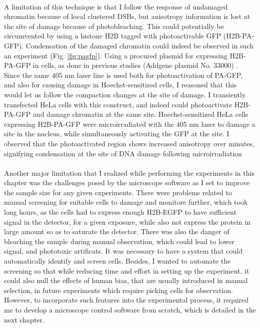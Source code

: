 \paragraph*{} A limitation of this technique is that I follow the response of undamaged chromatin because of local clustered DSBs, but anisotropy information is lost at the site of damage because of photobleaching. This could potentially be circumvented by using a histone H2B tagged with photoactivable GFP (H2B-PA-GFP). Condensation of the damaged chromatin could indeed be observed in such an experiment (Fig. \ref{fig:pagfp}). Using a procured plasmid for expressing H2B-PA-GFP in cells, as done in previous studies (Addgene plasmid No. 33000) \cite{kruhlak2006changes}. Since the same 405 nm laser line is used both for photoactivation of PA-GFP, and also for causing damage in Hoechst-sensitized cells, I reasoned that this would let us follow the compaction changes at the site of damage. I transiently transfected HeLa cells with this construct, and indeed could photoactivate H2B-PA-GFP and damage chromatin at the same site. Hoechst-sensitized HeLa cells expressing H2B-PA-GFP were microirradiated with the 405 nm laser to damage a site in the nucleus, while simultaneously activating the GFP at the site. I observed that the photoactivated region shows increased anisotropy over minutes, signifying condensation at the site of DNA damage following microirradiation


\paragraph*{} Another major limitation that I realized while performing the experiments in this chapter was the challenges posed by the microscope software as I set to improve the sample size for any given experiments. There were problems related to manual screening for suitable cells to damage and monitore further, which took long hours, as the cells had to express enough H2B-EGFP to have sufficient signal in the detector, for a given exposure, while also not express the protein in large amount so as to saturate the detector. There was also the danger of bleaching the sample during manual observation, which could lead to lower signal, and phototoxic artificats. It was necessary to have a system that could automatically identify and screen cells. Besides, I wanted to automate the screening so that while reducing time and effort in setting up the experiment, it could also null the effects of human bias, that are usually introduced in manual selection, in future experiments which require picking cells for observation. However, to incorporate such features into the experimental process, it required me to develop a microscope control software from scratch, which is detailed in the next chapter. 

